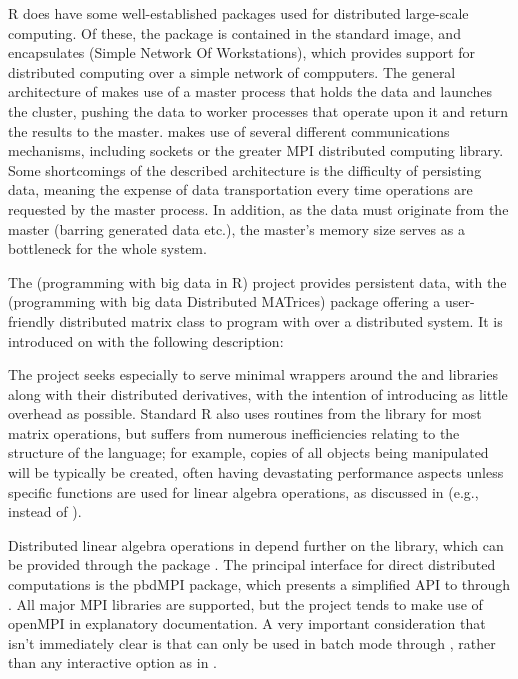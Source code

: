 R does have some well-established packages used for distributed
large-scale computing. Of these, the  package is
contained in the standard \R image, and encapsulates 
(Simple Network Of Workstations), which provides support for distributed
computing over a simple network of compputers. The general architecture
of  makes use of a master process that holds the data and
launches the cluster, pushing the data to worker processes that operate
upon it and return the results to the master.  makes use of
several different communications mechanisms, including sockets or the
greater MPI distributed computing library. Some shortcomings of the
described architecture is the difficulty of persisting data, meaning the
expense of data transportation every time operations are requested by
the master process. In addition, as the data must originate from the
master (barring generated data etc.), the master's memory size serves as
a bottleneck for the whole system.

The  (programming with big data in R) project provides
persistent data, with the  (programming with big data
Distributed MATrices) package offering a user-friendly distributed
matrix class to program with over a distributed system. It is introduced
on with the following description:


The project seeks especially to serve minimal wrappers around the 
and  libraries along with their distributed derivatives, with the
intention of introducing as little overhead as possible. Standard R also
uses routines from the library for most matrix operations, but suffers
from numerous inefficiencies relating to the structure of the language;
for example, copies of all objects being manipulated will be typically
be created, often having devastating performance aspects unless specific
functions are used for linear algebra operations, as discussed in
\textcite{schmidt2017programming} (e.g.,
 instead of ).

Distributed linear algebra operations in  depend further on the
 library, which can be provided through the  package
\cite{Chen2012pbdSLAPpackage}. The principal interface for direct
distributed computations is the pbdMPI package, which presents a
simplified API to  through \R \cite{Chen2012pbdMPIpackage}. All major
MPI libraries are supported, but the project tends to make use of
openMPI in explanatory documentation. A very important consideration
that isn't immediately clear is that  can only be used in batch
mode through , rather than any interactive option as in 
\cite{yu02:_rmpi}.

